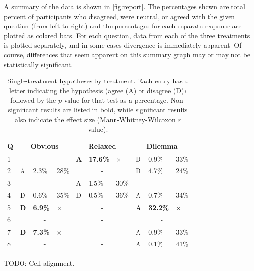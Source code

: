A summary of the data is shown in \cref{fig:report}.
%
The percentages shown are total percent of participants who disagreed, were neutral, or agreed with the given question (from left to right) and the percentages for each separate response are plotted as colored bars.
%
For each question, data from each of the three treatments is plotted separately, and in some cases divergence is immediately apparent.
%
Of course, differences that seem apparent on this summary graph may or may not be statistically significant.


\begin{table}
\bgroup
\def\arraystretch{1.1}
\setlength{\tabcolsep}{0.7em}
\begin{tabular}{p{0.3em} | p{0.3em} | p{1.8em} | p{1.2em} | p{0.3em} | p{1.8em} | p{1.2em} | p{0.3em} | p{1.8em} | p{1.2em} |}
Q & \multicolumn{3}{|c|}{Obvious} & \multicolumn{3}{|c|}{Relaxed} & \multicolumn{3}{|c|}{Dilemma} \\
\hline
1  & \multicolumn{3}{|c|}{-} & \textbf{A} & \textbf{17.6\%} & $\times$  & D & 0.9\% & 33\% \\
\hline
2  & A & 2.3\% & 28\%  & \multicolumn{3}{|c|}{-} & D & 4.7\% & 24\% \\
\hline
3  & \multicolumn{3}{|c|}{-} & A & 1.5\% & 30\%  & \multicolumn{3}{|c|}{-}\\
\hline           
4  & D & 0.6\% & 35\%  & D & 0.5\% & 36\%  & A & 0.7\% & 34\% \\
\hline
5  & \textbf{D} & \textbf{6.9\%} & $\times$  & \multicolumn{3}{|c|}{-} & \textbf{A} & \textbf{32.2\%} & $\times$  \\
\hline
6  & \multicolumn{3}{|c|}{-} & \multicolumn{3}{|c|}{-} & \multicolumn{3}{|c|}{-}\\
\hline
7  & \textbf{D} & \textbf{7.3\%} & $\times$  & \multicolumn{3}{|c|}{-} & A & 0.9\% & 33\% \\
\hline
8  & \multicolumn{3}{|c|}{-} & \multicolumn{3}{|c|}{-} & A & 0.1\% & 41\% \\
\hline
\end{tabular}
\egroup
  \caption{Single-treatment hypotheses by treatment. Each entry has a letter indicating the hypothesis (agree (A) or disagree (D)) followed by the $p$-value for that test as a percentage. Non-significant results are listed in bold, while significant results also indicate the effect size (Mann-Whitney-Wilcoxon $r$ value).}
  TODO: Cell alignment.
  \label{tab:single-results}
\end{table}


